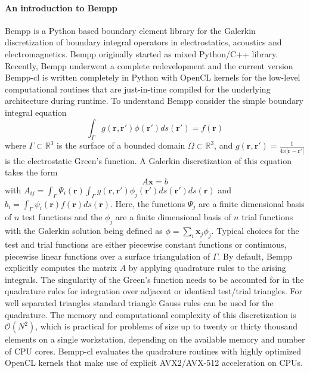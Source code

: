 \paragraph{An introduction to Bempp}
Bempp \cite{Betcke2021} is a Python based boundary element library for the Galerkin discretization of boundary integral operators in electrostatics, acoustics and electromagnetics.
Bempp originally started as mixed Python/C++ library.
Recently, Bempp underwent a complete redevelopment and the current version Bempp-cl is written completely in Python with OpenCL kernels for the low-level computational routines that are just-in-time compiled for the underlying architecture during runtime.
To understand Bempp consider the simple boundary integral equation
$$
\int_{\Gamma} g(\mathbf{r}, \mathbf{r'}) \phi(\mathbf{r'})ds(\mathbf{r'}) = f(\mathbf{r})
$$
where $\Gamma\subset\mathbb{R}^3$ is the surface of a bounded domain $\Omega\subset\mathbb{R}^3$, and $g(\mathbf{r}, \mathbf{r'}) = \frac{1}{4\pi|\mathbf{r}-\mathbf{r'}|}$ is the electrostatic Green's function.
A Galerkin discretization of this equation takes the form
$$
A\mathbf{x} = b
$$
with $A_{ij} = \int_{\Gamma}\Psi_i(\mathbf{r})\int_{\Gamma}g(\mathbf{r}, \mathbf{r'})\phi_j(\mathbf{r'})ds(\mathbf{r'})ds(\mathbf{r})$ and $b_i = \int_{\Gamma}\psi_i(\mathbf{r})f(\mathbf{r})ds(\mathbf{r})$.
Here, the functions $\Psi_j$ are a finite dimensional basis of $n$ test functions and the $\phi_j$ are a finite dimensional basis of $n$ trial functions with the Galerkin solution being defined as $\phi=\sum_{i}\mathbf{x}_j\phi_j$.
Typical choices for the test and trial functions are either piecewise constant functions or continuous, piecewise linear functions over a surface triangulation of $\Gamma$. 
By default, Bempp explicitly computes the matrix $A$ by applying quadrature rules to the arising integrals.
The singularity of the Green's function needs to be accounted for in the quadrature rules for integration over adjacent or identical test/trial triangles.
For well separated triangles standard triangle Gauss rules can be used for the quadrature.
The memory and computational complexity of this discretization is $\mathcal{O}(N^2)$, which is practical for problems of size up to twenty or thirty thousand elements on a single workstation, depending on the available memory and number of CPU cores.
Bempp-cl evaluates the quadrature routines with highly optimized OpenCL kernels that make use of explicit AVX2/AVX-512 acceleration on CPUs.

